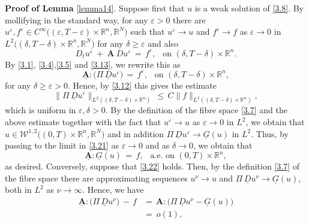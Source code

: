 \documentclass{amsart}
\theoremstyle{definition}
\numberwithin{equation}{section}
\begin{document}
{\medskip \noindent \textbf{Proof of Lemma} } \ref{lemma14}. Suppose first that $u$ is a weak solution of \eqref{3.8}. By mollifying in the standard way, for any ${\varepsilon}>0$ there are $u^{\varepsilon},f^{\varepsilon} \in C^\infty\big(({\varepsilon},T-{\varepsilon})\!{\times}\!{\mathbb{R}}^n,{\mathbb{R}}^N\big)$ such that $u^{\varepsilon} {\longrightarrow} u$ and $f^{\varepsilon} {\longrightarrow} f$ as ${\varepsilon}{\rightarrow} 0$ in $L^2\big(({\delta},T-{\delta}){\times}{\mathbb{R}}^n,{\mathbb{R}}^N\big)$ for any ${\delta}\geq{\varepsilon}$ and also
\[
D_t u^{\varepsilon} \ +\ {\textbf{A}}\:Du^{\varepsilon}\, =\, f^{\varepsilon},\ \ \text{ on }({\delta},T-{\delta}){\times}{\mathbb{R}}^n.
\]
By \eqref{3.1}, \eqref{3.4},\eqref{3.5} and  \eqref{3.13}, we rewrite this as
\begin{equation} \label{3.21}
{\underline{\textbf{A}}}{\!:\!} \big(\Pi\, {\underline{D}} u^{\varepsilon}\big)\,  =\, f^{\varepsilon},\ \ \text{ on }({\delta},T-{\delta}){\times}{\mathbb{R}}^n,
\end{equation}
for any ${\delta}\geq {\varepsilon}>0$. Hence, by \eqref{3.12} this gives the estimate
\[
\big\| \Pi\, {\underline{D}} u^{\varepsilon} \big\|_{L^2(({\delta},T-{\delta}){\times}{\mathbb{R}}^n)}\, \leq\, C \|f\|_{L^2(({\delta},T-{\delta}){\times}{\mathbb{R}}^n)},
\]
which is uniform in ${\varepsilon},{\delta}>0$. By the definition  of the fibre space \eqref{3.7} and the above estimate together with the fact that $u^{\varepsilon}{\longrightarrow} u$ as ${\varepsilon}{\rightarrow}0$ in $L^2$, we obtain that $u\in \mathscr{W}^{1,2}\big((0,T){\times}{\mathbb{R}}^n,{\mathbb{R}}^N\big)$ and in addition  $ \Pi\, {\underline{D}} u^{\varepsilon}  {\longrightarrow} \underline{G}(u)$ in $L^2$. Thus, by passing to the limit in \eqref{3.21} as ${\varepsilon}{\rightarrow}0$ and as ${\delta}{\rightarrow}0$, we obtain that
\begin{equation} \label{3.22}
{\underline{\textbf{A}}}{\!:\!} \underline{G}(u)\, =\, f,\ \ \text{ a.e.\ on }(0,T){\times}{\mathbb{R}}^n,
\end{equation}
as desired.  Conversely, suppose that \eqref{3.22} holds. Then, by the definition \eqref{3.7} of the fibre space there are approximating sequences $u^\nu {\longrightarrow} u$ and $\Pi \, {\underline{D}} u^\nu {\longrightarrow} \underline{G}(u)$, both in $L^2$ as $\nu {\rightarrow} \infty$. Hence, we have
\[
\begin{split}
{\underline{\textbf{A}}}{\!:\!} \big(\Pi\, {\underline{D}} u^\nu\big)\, -\,f &=\,   {\textbf{A}}{\!:\!}\big(\Pi\,{\underline{D}} u^\nu-\underline{G}(u) \big)\\
&=\ o(1),
\end{split}
\]
\end{document}
